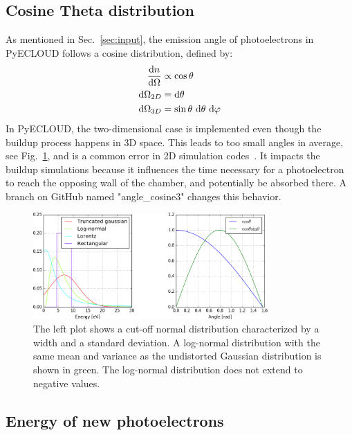 
\subsection{Cosine Theta distribution}
As mentioned in Sec.~\ref{sec:input}, the emission angle of photoelectrons in PyECLOUD follows a cosine distribution, defined by:
\begin{align}
    \frac{\text{d}n}{\text{d}\Omega} &\propto \cos\theta
    \\
    \text{d}\Omega_{2D} &= \text{d}\theta
    \\
    \text{d}\Omega_{3D} &= \sin\theta~\text{d}\theta~\text{d}\varphi
    \label{eq:angles}
\end{align}
In PyECLOUD, the two-dimensional case is implemented even though the buildup process happens in 3D space.
This leads to too small angles in average, see Fig.~\ref{fig:distribution}, and is a common error in 2D simulation codes~\cite{angle}.
It impacts the buildup simulations because it influences the time necessary for a photoelectron to reach the opposing wall of the chamber, and potentially be absorbed there.
A branch on GitHub named "angle\_cosine3" changes this behavior.

\begin{figure}[tbh]
    \centering
    \includegraphics[width=0.8\textwidth]{../plots/distributions.png}
    \caption{
        The left plot shows a cut-off normal distribution characterized by a width and a standard deviation.
        A log-normal distribution with the same mean and variance as the undistorted Gaussian distribution is shown in green.
    The log-normal distribution does not extend to negative values.
    }
    \label{fig:distribution}
\end{figure}


\subsection{Energy of new photoelectrons}

